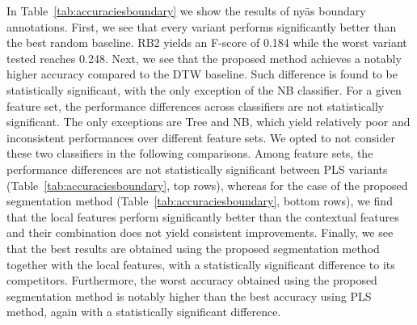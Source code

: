 In Table~\ref{tab:accuraciesboundary} we show the results of ny\={a}s boundary annotations. First, we see that every variant performs significantly better than the best random baseline. RB2 yields an F-score of 0.184 while the worst variant tested reaches 0.248. Next, we see that the proposed method achieves a notably higher accuracy compared to the DTW baseline. Such difference is found to be statistically significant, with the only exception of the NB classifier. For a given feature set, the performance differences across classifiers are not statistically significant. The only exceptions are Tree and NB, which yield relatively poor and inconsistent performances over different feature sets. We opted to not consider these two classifiers in the following comparisons. Among  feature sets, the performance differences are not statistically significant between PLS variants (Table~\ref{tab:accuraciesboundary}, top rows), whereas for the case of the proposed segmentation method (Table~\ref{tab:accuraciesboundary}, bottom rows), we find that the local features perform significantly better than the contextual features and their combination does not yield consistent improvements. Finally, we see that the best results are obtained using the proposed segmentation method together with the local features, with a statistically significant difference to its competitors. Furthermore, the worst accuracy obtained using the proposed segmentation method is notably higher than the best accuracy using PLS method, again with a statistically significant difference.


